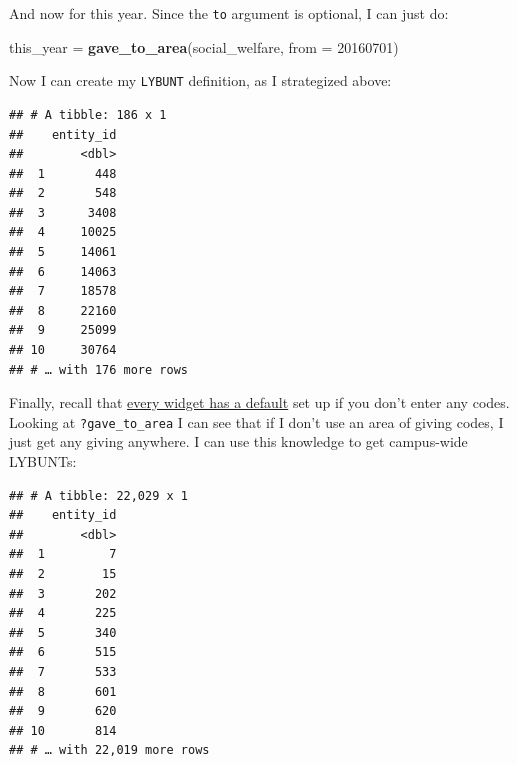 \documentclass[]{book}
\newenvironment{Shaded}{\begin{snugshade}}{\end{snugshade}}
\newcommand{\DataTypeTok}[1]{\textcolor[rgb]{0.13,0.29,0.53}{#1}}
\newcommand{\DecValTok}[1]{\textcolor[rgb]{0.00,0.00,0.81}{#1}}
\newcommand{\KeywordTok}[1]{\textcolor[rgb]{0.13,0.29,0.53}{\textbf{#1}}}
\newcommand{\NormalTok}[1]{#1}
\newcommand{\OperatorTok}[1]{\textcolor[rgb]{0.81,0.36,0.00}{\textbf{#1}}}
\newcommand{\StringTok}[1]{\textcolor[rgb]{0.31,0.60,0.02}{#1}}
\begin{document}
And now for this year. Since the \texttt{to} argument is optional, I can just do:

\begin{Shaded}
\begin{Highlighting}[]
\NormalTok{this_year =}\StringTok{ }\KeywordTok{gave_to_area}\NormalTok{(social_welfare, }\DataTypeTok{from =} \DecValTok{20160701}\NormalTok{)}
\end{Highlighting}
\end{Shaded}

Now I can create my \texttt{LYBUNT} definition, as I strategized above:

\begin{Shaded}
\end{Shaded}

\begin{verbatim}
## # A tibble: 186 x 1
##    entity_id
##        <dbl>
##  1       448
##  2       548
##  3      3408
##  4     10025
##  5     14061
##  6     14063
##  7     18578
##  8     22160
##  9     25099
## 10     30764
## # … with 176 more rows
\end{verbatim}

Finally, recall that \protect\hyperlink{use-defaults}{every widget has a default} set up if you don't enter any codes. Looking at \texttt{?gave\_to\_area} I can see that if I don't use an area of giving codes, I just get any giving anywhere. I can use this knowledge to get campus-wide LYBUNTs:

\begin{Shaded}
\end{Shaded}

\begin{verbatim}
## # A tibble: 22,029 x 1
##    entity_id
##        <dbl>
##  1         7
##  2        15
##  3       202
##  4       225
##  5       340
##  6       515
##  7       533
##  8       601
##  9       620
## 10       814
## # … with 22,019 more rows
\end{verbatim}
\end{document}
